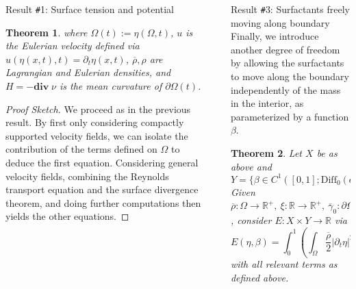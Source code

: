 \documentclass[final,noamsthm]{beamer}
\newtheorem{thm}{Theorem}
\newcommand{\R}{\mathbb{R}}
\renewcommand{\div}{\mathbf{div}}
\newcommand{\Diff}{\text{Diff}}
\renewcommand{\bar}{\overline}
\def\p{\partial}
\def\st{\;\vert\;}
\newcommand{\colsection}[1]{
    \begin{beamercolorbox}[colsep*=0ex,dp=2ex,center]{block title}
        \vskip0pt
        \usebeamerfont{block section} #1
        \vskip-1.25ex
        \begin{beamercolorbox}[colsep=0.05ex]{block separator}\end{beamercolorbox}
    \end{beamercolorbox}
    {\parskip0pt\par}
    \vskip0pt
}
\newlength{\sepwidth}
\newlength{\colwidth}
\newcommand{\separatorcolumn}{\begin{column}{\sepwidth}\end{column}}
\begin{document}
\begin{frame}[t]
\begin{columns}[t]
\begin{column}{\colwidth}
\begin{block}{Result \texttt{\#}1: Surface tension and potential}
\begin{thm}
                    where $\Omega(t) := \eta (\Omega, t)$, $u$ is the Eulerian velocity defined via $u(\eta(x,t),t)=\p_t\eta(x,t)$, $\bar \rho,\rho$ are Lagrangian and Eulerian  densities, and $H=-\div\;\nu$ is the mean curvature of $\p\Omega(t)$.
                \end{thm}
                \begin{proof}[Proof Sketch]
                    We proceed as in the previous result.
                    By first only considering compactly supported velocity fields, we can isolate the contribution of the terms defined on $\Omega$ to deduce the first equation.
                    Considering general velocity fields, combining the Reynolds transport equation and the surface divergence theorem, and doing further computations then yields the other equations.
                \end{proof}

            \end{block}









        \end{column}

        \separatorcolumn

        \begin{column}{\colwidth}
            \vspace{-1.5cm}

            \begin{block} {Result \texttt{\#}3: Surfactants freely moving along boundary}
                Finally, we introduce another degree of freedom by allowing the surfactants to move along the boundary independently of the mass in the interior, as parameterized by a function $\beta$.
                \begin{thm}
                    Let $X$ be as above and
                    \begin{equation*}
                        Y=\{\beta\in C^1([0,1];\Diff_0(\p\Omega))\st \beta(0,x)=x\}
                    \end{equation*}
                    Given $\bar \rho:\Omega\to \R^+,\ \xi:\R\to \R^+, \ \bar\gamma_0:\p\Omega\to \R^+,\ \varphi\in C^1(\R^n)$, consider $E:X\times Y\to \R$ via
                    \begin{equation}
                        E(\eta,\beta)=\int_0^1\left(\int_{\Omega}\dfrac{\bar \rho}{2}|\p_t\eta|^2-\varphi(\eta)\;dx+\int_{\p\Omega}\dfrac{\bar\gamma_0}{2}|\p_t(\eta\circ\beta)|^2\;dS-\int_{\p\Omega(t)}\xi(\gamma)\;dS\right)dt
                    \end{equation}
                    with all relevant terms as defined above.


\end{thm}
\end{block}
\end{column}
\end{columns}
\end{frame}
\end{document}
